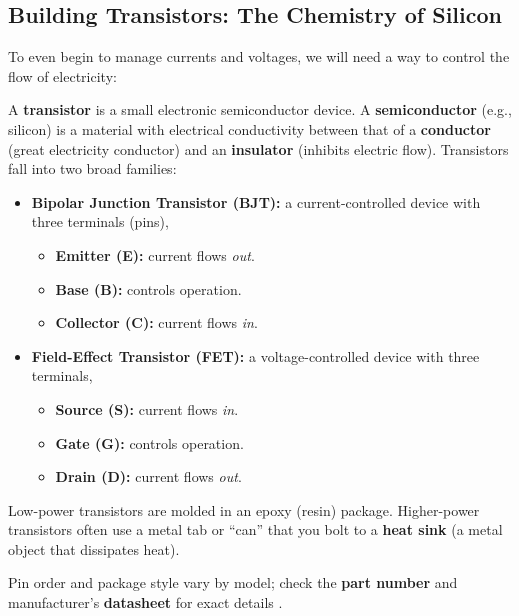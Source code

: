 \newpage 

\subsection{Building Transistors: The Chemistry of Silicon}

\noindent
To even begin to manage currents and voltages, we will need a way to control the flow of electricity:

\begin{Def}[Transistor]

    \label{def:transistor}

  A \textbf{transistor} is a small electronic semiconductor device. A \textbf{semiconductor} (e.g., silicon) is a material with electrical 
    conductivity between that of a \textbf{conductor} (great electricity conductor) and an \textbf{insulator}
    (inhibits electric flow). Transistors fall into two broad families:

  \begin{itemize}
    \item \textbf{Bipolar Junction Transistor (BJT):} a current-controlled device with three terminals (pins),
    \begin{itemize}
        \item \textbf{Emitter (E):} current flows \emph{out}.
        \item \textbf{Base (B):} controls operation.
        \item \textbf{Collector (C):} current flows \emph{in}.
    \end{itemize}
    \item \textbf{Field-Effect Transistor (FET):} a voltage-controlled device with three terminals,
    \begin{itemize}
        \item \textbf{Source (S):} current flows \emph{in}.
        \item \textbf{Gate (G):} controls operation.
        \item \textbf{Drain (D):} current flows \emph{out}.
    \end{itemize}
  \end{itemize}

  \noindent
  Low-power transistors are molded in an epoxy (resin) package. Higher-power transistors often use a metal tab or ``can'' that you bolt to a \textbf{heat sink} (a metal object that dissipates heat).

  Pin order and package style vary by model; check the \textbf{part number} and manufacturer's \textbf{datasheet} for exact details \cite{what_is_transistor2022, engineermindset2024mosfet}.
\end{Def}

